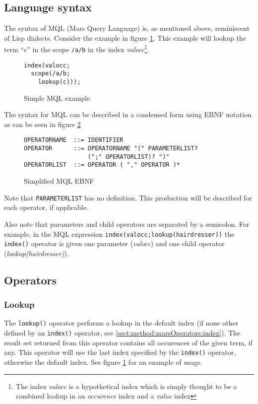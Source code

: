 \subsection{Language syntax}
The syntax of MQL (Mars Query Language) is, as mentioned above, reminiscent of
Lisp dialects. Consider the example in figure \ref{figure:mql:op_example}. This
example will lookup the term ``c'' in the scope \texttt{/a/b} in the index
\textit{valocc}\footnote{The index \textit{valocc} is a hypothetical index
which is simply thought to be a combined lookup in an \textit{occurence}
index and a \textit{value} index}.

\begin{figure}[!h]
\centering
\begin{Verbatim}
index(valocc; 
  scope(/a/b;
    lookup(c)));
\end{Verbatim}
\caption{Simple MQL example}
\label{figure:mql:op_example}
\end{figure}

The syntax for MQL can be described in a condensed form using EBNF notation as
can be seen in figure \ref{figure:mql:ebnf}
\begin{figure}[!h]
\centering
\begin{Verbatim}
OPERATORNAME  ::= IDENTIFIER
OPERATOR      ::= OPERATORNAME "(" PARAMETERLIST? 
                  (";" OPERATORLIST)? ")"
OPERATORLIST  ::= OPERATOR ( "," OPERATOR )*
\end{Verbatim}
\caption{Simplified MQL EBNF}
\label{figure:mql:ebnf}
\end{figure}

Note that \texttt{PARAMETERLIST} has no definition. This production will be
described for each operator, if applicable.

Also note that parameters and child operators are separated by a semicolon. For
example, in the MQL expression \texttt{index(valocc;lookup(hairdresser))} the
\texttt{index()} operator is given one parameter (\textit{valocc}) and one
child operator (\textit{lookup(hairdresser)}).

\subsection{Operators}
\label{sect:method:marsOperators}

\subsubsection{Lookup}
\label{sect:method:marsOperators:lookup}
The \texttt{lookup()} operator performs a lookup in the default index (if none
other defined by an \texttt{index()} operator, see
\ref{sect:method:marsOperators:index}). The result set returned from this
operator contains all occurences of the given term, if any. This operator will
use the last index specified by the \texttt{index()} operator, otherwise the
default index. See figure \ref{figure:mql:op_example} for an example of usage. 

